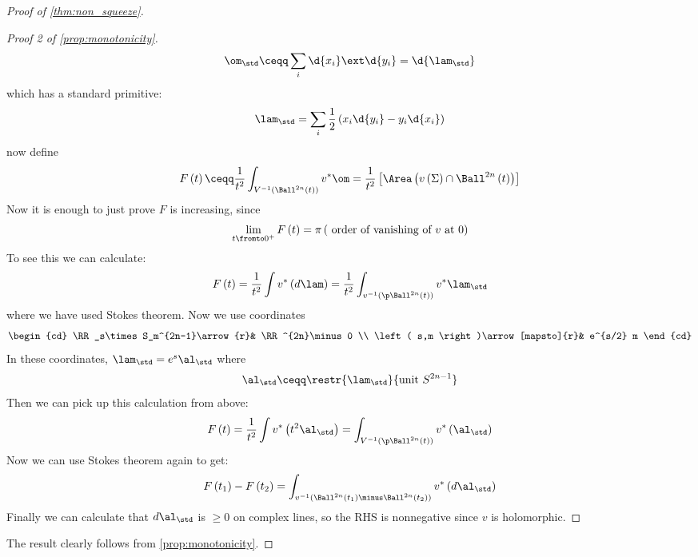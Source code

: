 \documentclass{amsart}
\begin{document}
\begin{proof}[Proof of \cref{thm:non_squeeze}]
\begin{proof}[Proof 2 of \cref{prop:monotonicity}]
\begin{equation}
\om_\std \ceqq
\sum_i \d{x_i} \ext \d{y_i} = \d{\lam_\std}
\end{equation}
which has a standard primitive:
\begin{equation}
\lam_\std = \sum_i
\frac{1}{2} \left( x_i \d{y_i} - y_i \d{x_i}  \right)
\end{equation}
now define
\begin{equation}
F\left( t \right) \ceqq 
\frac{1}{t^2} 
\int_{V^{-1}\left( \Ball^{2n}\left( t \right) \right)}
v^* \om = \frac{1}{t^2}\left[ \Area\left( v\left( \Sigma \right)\cap 
\Ball^{2n}\left( t \right)\right) \right]
\end{equation}
Now it is enough to just prove $F$ is increasing, since
\begin{equation}
\lim_{t\fromto 0^+} F\left( t \right) = 
\pi \left( \text{ order of vanishing of } v \text{ at } 0 \right)
\end{equation}
To see this we can calculate:
\begin{equation}
F\left( t \right) = \frac{1}{t^2} \int v^*\left( d\lam \right) = 
\frac{1}{t^2} \int_{v^{-1}\left( \p \Ball^{2n}\left( t \right) \right)}
v^* \lam_\std
\end{equation}
where we have used Stokes theorem.
Now we use coordinates
\begin{equation}
\begin{cd}
\RR_s\times S_m^{2n-1}\arrow{r}&
\RR^{2n}\minus 0 \\
\left( s,m \right)\arrow[mapsto]{r}&
e^{s/2} m
\end{cd}
\end{equation}
In these coordinates, $\lam_\std = e^s \al_\std$ where
\begin{equation}
\al_\std \ceqq \restr{\lam_\std}{\text{unit } S^{2n-1}}
\end{equation}
Then we can pick up this calculation from above:
\begin{equation}
F\left( t \right) = \frac{1}{t^2}
\int v^*\left( t^2 \al_\std \right) = 
\int_{V^{-1}\left( \p \Ball^{2n}\left( t \right) \right)}
v^*\left( \al_\std\right)
\end{equation}
Now we can use Stokes theorem again to get:
\begin{equation}
F\left( t_1 \right) - F\left( t_2 \right) = 
\int_{v^{-1}\left( \Ball^{2n}\left( t_1 \right)\minus
\Ball^{2n}\left( t_2 \right)\right)}
v^*\left( d \al_\std \right)
\end{equation}
Finally we can calculate that $d\al_\std$ is $\geq 0$ on complex lines, so the RHS
is nonnegative since $v$ is holomorphic.
\end{proof}
The result clearly follows from \cref{prop:monotonicity}.
\end{proof}
\end{document}
